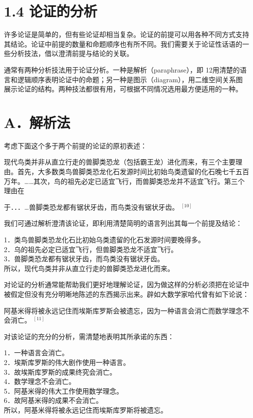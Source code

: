 \section*{1.4 论证的分析}
许多论证是简单的，但有些论证却相当复杂。论证的前提可以用各种不同方式支持其结论。论证中前提的数量和命题顺序也有所不同。我们需要关于论证性话语的一些分析技法，借以澄清前提与结论的关联。

通常有两种分析技法用于论证分析。一种是解析（paraphrase），即 12用清楚的语言和逻辑顺序表明论证中的命题；另一种是图示（diagram），用二维空间关系图展示论证的结构。两种技法都很有用，可根据不同情况选用最方便适用的一种。

\section*{A．解析法}
考虑下面这个多于两个前提的论证的原初表述：

现代鸟类并非从直立行走的兽脚类恐龙（包括霸王龙）进化而来，有三个主要理由。首先，大多数类鸟兽脚类恐龙化石发源时间比初始鸟类遗留的化石晚七千五百万年。……其次，鸟的祖先必定已适宜飞行，而兽脚类恐龙并不适宜飞行。第三个理由在

于．．．…兽脚类恐龙都有锯状牙齿，而鸟类没有锯状牙齿。 ${ }^{[10]}$

我们可通过解析澄清该论证，即利用清楚简明的语言列出其每一个前提及结论：

1．类鸟兽脚类恐龙化石比初始乌类遗留的化石发源时间要晚得多。\\
2．乌的祖先必定已适宜飞行，但兽脚类恐龙不适宜飞行。\\
3．兽脚类恐龙都有锯状牙齿，而鸟类没有锯状牙齿。\\
所以，现代鸟类并非从直立行走的兽脚类恐龙进化而来。

对论证的分析通常能帮助我们更好地理解论证，因为做这样的分析必须把在论证中被假定但没有充分明晰地陈述的东西揭示出来。辟如大数学家哈代曾有如下论说：

阿基米得将被永远记住而埃斯库罗斯会被遗忘，因为一种语言会消亡而数学理念不会消亡。 ${ }^{[11]}$

对该论证的充分的分析，需清楚地表明其所承诺的东西：

1．一种语言会消亡。\\
2．埃斯库罗斯的伟大剧作使用一种语言。\\
3．故埃斯库罗斯的成果终究会消亡。\\
4．数学理念不会消亡。\\
5．阿基米得的伟大工作使用数学理念。\\
6．故阿基米得的成果不会消亡。\\
所以，阿基米得将被永远记住而埃斯库罗斯将被遗忘。

